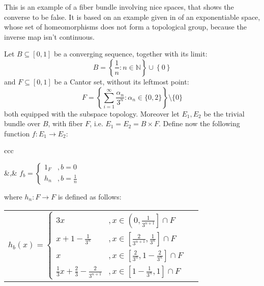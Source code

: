 \begin{example} This is an example of a fiber bundle involving nice spaces, that shows the converse to be false. It is based on an example given in \cite{counterexample} of an exponentiable space, whose set of homeomorphisms does not form a topological group, because the inverse map isn't continuous.

Let $B\subseteq[0,1]$ be a converging sequence, together with its limit:
\[B=\left\{\frac{1}{n}:n\in\mathbb{N}\right\}\cup\left\{0\right\}\]
and $F\subseteq[0,1]$ be a Cantor set, without its leftmost point:
\[F=\left\{\sum_{i=1}^{\infty}\frac{\alpha_n}{3^n}:\alpha_n\in\{0,2\}\right\}\setminus\{0\}\]
both equipped with the subspace topology. Moreover let $E_1,E_2$ be the trivial bundle over $B$, with fiber $F$, i.e. $E_1=E_2=B\times F$. Define now the following function $f:E_1\to E_2$:
\begin{center}
\begin{tabular}{ccc}
&,&
$\displaystyle f_b=\left\{\begin{array}{ll}
1_F&,b=0\\[1.2em]
h_n&,b=\frac{1}{n}
\end{array}\right.$
\end{tabular}
\end{center}
where $h_n:F\to F$ is defined as follows:
\begin{center}
\begin{tabular}{cc}
$\displaystyle h_b(x)=\left\{\begin{array}{ll}
3x&,x\in\left(0,\frac{1}{3^{n+1}}\right]\cap F\\[1em]
x+1-\frac{1}{3^n}&,x\in\left[\frac{2}{3^{n+1}},\frac{1}{3^n}\right]\cap F\\[1em]
x&,x\in\left[\frac{2}{3^n},1-\frac{2}{3^n}\right]\cap F\\[1em]
\frac{1}{3}x+\frac{2}{3}-\frac{2}{3^{n+1}}&,x\in\left[1-\frac{1}{3^n},1\right]\cap F
\end{array}\right.$
&
\end{tabular}
\end{center}
\end{example}
